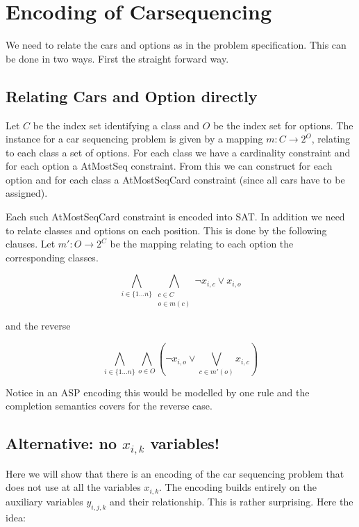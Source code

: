 \documentclass[]{llncs}
\begin{document}
\section{Encoding of Carsequencing}

We need to relate the cars and options as in the problem specification.
This can be done in two ways. First the straight forward way. 

\subsection{Relating Cars and Option directly}

Let $C$ be the index set identifying a class and $O$ be the index set
for options. The instance for a car sequencing problem is given by a
mapping $m : C\rightarrow 2^O$, relating to each class a set of options.
For each class we have a cardinality constraint and for each option a
AtMostSeq constraint. From this we can construct for each option and for
each class a AtMostSeqCard constraint (since all cars have to be
assigned). 

Each such AtMostSeqCard constraint is encoded into SAT. In addition we
need to relate classes and options on each position. This is done by the
following clauses.  Let $m':O \rightarrow 2^C$ be the mapping relating
to each option the corresponding classes. 

\begin{equation}
    \bigwedge_{i\in \{1\ldots n\}} \bigwedge_{\substack{c \in C \\ o \in m(c)}} \neg x_{i,c} \vee x_{i,o}
\end{equation}

and the reverse

\begin{equation}
    \bigwedge_{i \in \{1\dots n\}} \bigwedge_{o\in O} \left(\neg x_{i,o} \vee
    \bigvee_{c \in m'(o)} x_{i,c}\right)
\end{equation}

Notice in an ASP encoding this would be modelled by one rule and the
completion semantics covers for the reverse case. 

\subsection{Alternative: no $x_{i,k}$ variables!}

Here we will show that there is an encoding of the car sequencing
problem that does not use at all the variables $x_{i,k}$. The encoding
builds entirely on the auxiliary variables $y_{i,j,k}$ and their
relationship. This is rather surprising. Here the idea: 
\end{document}
